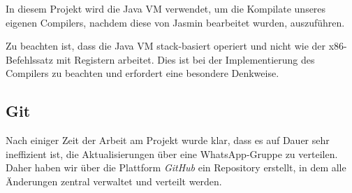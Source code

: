 In diesem Projekt wird die Java VM verwendet, um die Kompilate unseres eigenen Compilers, nachdem diese von Jasmin bearbeitet wurden, auszuführen.

Zu beachten ist, dass die Java VM stack-basiert operiert und nicht wie der x86-Befehlssatz mit Registern arbeitet. Dies ist bei der Implementierung des Compilers zu beachten und erfordert eine besondere Denkweise.

\subsection{Git}
Nach einiger Zeit der Arbeit am Projekt wurde klar, dass es auf Dauer sehr ineffizient ist, die Aktualisierungen über eine WhatsApp-Gruppe zu verteilen. Daher haben wir über die Plattform \textit{GitHub} ein Repository erstellt, in dem alle Änderungen zentral verwaltet und verteilt werden.
